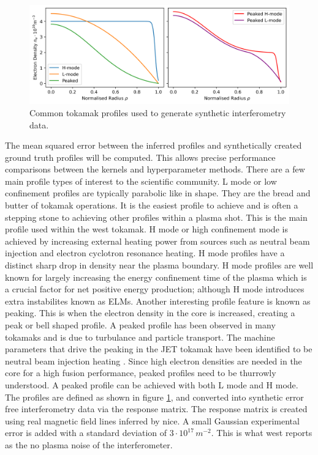 \begin{figure}[H]
    \centering
    \includegraphics[width=\textwidth]{images/syntheticProfiles.png}
    \caption{Common tokamak profiles used to generate synthetic interferometry data.}
    \label{fig:groundtruth}
\end{figure}

The mean squared error between the inferred profiles and synthetically created ground truth profiles will be computed. This allows precise performance comparisons between the kernels and hyperparameter methods. There are a few main profile types of interest to the scientific community. L mode or low confinement profiles are typically parabolic like in shape. They are the bread and butter of tokamak operations. It is the easiest profile to achieve and is often a stepping stone to achieving other profiles within a plasma shot. This is the main profile used within the \gls{west} tokamak. H mode or high confinement mode is achieved by increasing external heating power from sources such as neutral beam injection and electron cyclotron resonance heating. H mode profiles have a distinct sharp drop in density near the plasma boundary. H mode profiles are well known for largely increasing the energy confinement time of the plasma which is a crucial factor for net positive energy production; although H mode introduces extra instabilites known as ELMs. Another interesting profile feature is known as peaking. This is when the electron density in the core is increased, creating a peak or bell shaped profile. A peaked profile has been observed in many tokamaks and is due to turbulance and particle transport. The machine parameters that drive the peaking in the JET tokamak have been identified to be neutral beam injection heating \cite{talaPeaking2022}. Since high electron densities are needed in the core for a high fusion performance, peaked profiles need to be thurrowly understood. A peaked profile can be achieved with both L mode and H mode. The profiles are defined as shown in figure \ref{fig:groundtruth}, and converted into synthetic error free interferometry data via the response matrix. The response matrix is created using real magnetic field lines inferred by \gls{nice}. A small Gaussian experimental error is added with a standard deviation of $3\cdot10^{17} \, m^{-2}$. This is what \gls{west} reports as the no plasma noise of the interferometer.

